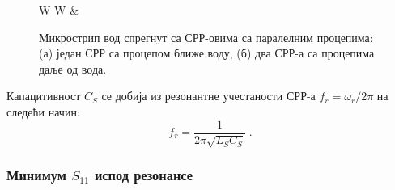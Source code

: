 \documentclass[main.tex]{subfiles}
\begin{document}
\begin{figure}[!t]
\begin{tabular}{W W}
{    \label{f3c}} &
\end{tabular}
\caption{Микрострип вод спрегнут са СРР-овима са паралелним процепима: (а) један СРР са процепом ближе воду, (б) два СРР-а са процепима даље од вода.} 
\label{f3}
\end{figure}

Капацитивност $C_S$ се добија из резонантне учестаности СРР-а $f_r=\omega_r/2\pi$ на следећи начин:
\begin{equation}
f_r = \frac{1}{2\pi \sqrt{L_SC_S}}\;.
\end{equation}

\subsubsection{Минимум $S_{11}$ испод резонансе}
\end{document}
